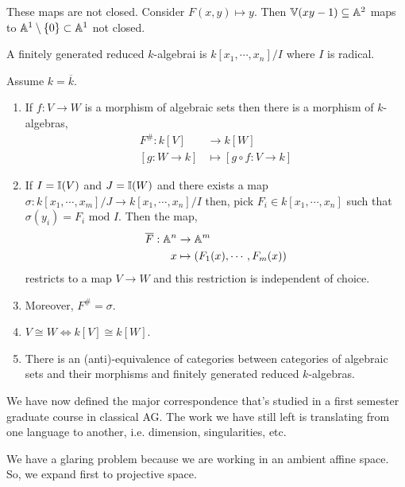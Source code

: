 \documentclass[12pt]{amsart}
\begin{document}
\begin{remark}
    These maps are not closed. Consider $F(x,y) \mapsto y$. Then $\mathbb V(xy-1) \subseteq \mathbb A^2$ maps to $\mathbb A^1 \setminus \{0\} \subset \mathbb A^1$ not closed.  
\end{remark}

\begin{definition}
    A finitely generated reduced $k$-algebrai is $k[x_1, \cdots, x_n]/I$ where $I$ is radical.     
\end{definition}

\begin{theorem}[Nullstellensatz II]
    Assume $k = \overline{k}$. 
    \begin{enumerate}
        \item If $f: V \to W$ is a morphism of algebraic sets then there is a morphism of $k$-algebras, 
        \begin{align*}
            F^\#: k[V] &\to k[W] \\
            [g: W \to k] &\mapsto [g\circ f: V \to k]
        \end{align*}
        \item If $I = \mathbb I(V)$ and $J = \mathbb I(W)$ and there exists a map $\sigma: k[x_1, \cdots, x_m]/J \to k[x_1, \cdots, x_n]/I$ then, pick $F_i \in k[x_1, \cdots, x_n]$ such that $\sigma(y_i) = F_i \text{ mod } I$. Then the map, 
        \begin{align*}
            \overline{F}: \mathbb A^n &\to \mathbb A^m \\
            x &\mapsto (F_1(x), \cdots, F_m(x))
        \end{align*}
        restricts to a map $V \to W$ and this restriction is independent of choice. 
        \item Moreover, $F^\# = \sigma$. 
        \item $V \cong W \iff k[V] \cong k[W]$. 
        \item There is an (anti)-equivalence of categories between categories of algebraic sets and their morphisms and finitely generated reduced $k$-algebras. 
    \end{enumerate}
\end{theorem}

We have now defined the major correspondence that's studied in a first semester graduate course in classical AG. The work we have still left is translating from one language to another, i.e. dimension, singularities, etc. 


We have a glaring problem because we are working in an ambient affine space. So, we expand first to projective space. 
\end{document}
